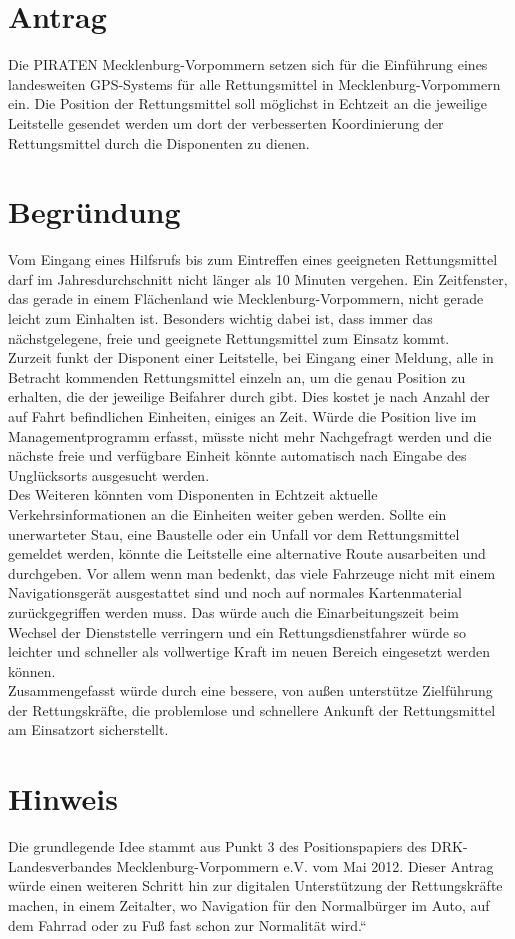 \section{Antrag}

Die PIRATEN Mecklenburg-Vorpommern setzen sich für die Einführung eines landesweiten GPS-Systems für alle Rettungsmittel in Mecklenburg-Vorpommern ein. Die Position der Rettungsmittel soll möglichst in Echtzeit an die jeweilige Leitstelle gesendet werden um dort der verbesserten Koordinierung der Rettungsmittel durch die Disponenten zu dienen.

\section{Begründung}

Vom Eingang eines Hilfsrufs bis zum Eintreffen eines geeigneten Rettungsmittel darf im Jahresdurchschnitt nicht länger als 10 Minuten vergehen. Ein Zeitfenster, das gerade in einem Flächenland wie Mecklenburg-Vorpommern, nicht gerade leicht zum Einhalten ist. Besonders wichtig dabei ist, dass immer das nächstgelegene, freie und geeignete Rettungsmittel zum Einsatz kommt.\\Zurzeit funkt der Disponent einer Leitstelle, bei Eingang einer Meldung, alle in Betracht kommenden Rettungsmittel einzeln an, um die genau Position zu erhalten, die der jeweilige Beifahrer durch gibt. Dies kostet je nach Anzahl der auf Fahrt befindlichen Einheiten, einiges an Zeit. Würde die Position live im Managementprogramm erfasst, müsste nicht mehr Nachgefragt werden und die nächste freie und verfügbare Einheit könnte automatisch nach Eingabe des Unglücksorts ausgesucht werden.\\Des Weiteren könnten vom Disponenten in Echtzeit aktuelle Verkehrsinformationen an die Einheiten weiter geben werden. Sollte ein unerwarteter Stau, eine Baustelle oder ein Unfall vor dem Rettungsmittel gemeldet werden, könnte die Leitstelle eine alternative Route ausarbeiten und durchgeben. Vor allem wenn man bedenkt, das viele Fahrzeuge nicht mit einem Navigationsgerät ausgestattet sind und noch auf normales Kartenmaterial zurückgegriffen werden muss. Das würde auch die Einarbeitungszeit beim Wechsel der Dienststelle verringern und ein Rettungsdienstfahrer würde so leichter und schneller als vollwertige Kraft im neuen Bereich eingesetzt werden können.\\Zusammengefasst würde durch eine bessere, von außen unterstütze Zielführung der Rettungskräfte, die problemlose und schnellere Ankunft der Rettungsmittel am Einsatzort sicherstellt.

\section{Hinweis}

Die grundlegende Idee stammt aus Punkt 3 des Positionspapiers des DRK-Landesverbandes Mecklenburg-Vorpommern e.V. vom Mai 2012. Dieser Antrag würde einen weiteren Schritt hin zur digitalen Unterstützung der Rettungskräfte machen, in einem Zeitalter, wo Navigation für den Normalbürger im Auto, auf dem Fahrrad oder zu Fuß fast schon zur Normalität wird.``

